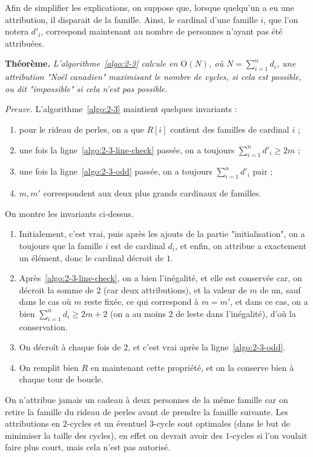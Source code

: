 \documentclass{../../notes}
\begin{document}
  Afin de simplifier les explications, on suppose que, lorsque quelqu'un a eu une attribution, il disparait de la famille.
  Ainsi, le cardinal d'une famille $i$, que l'on notera $d'_i$, correspond maintenant au nombre de personnes n'ayant pas été attribuées.

  \textbf{Théorème.} \textsl{L'algorithme~\ref{algo:2-3} calcule en $\mathrm{O}(N)$, où $N = \sum_{i=1}^n d_i$, une attribution "Noël canadien" maximisant le nombre de cycles, si cela est possible, ou dit "impossible" si cela n'est pas possible.}

  \textit{Preuve.} L'algorithme~\ref{algo:2-3} maintient quelques invariants :
  \begin{enumerate}
    \item pour le rideau de perles, on a que $R[i]$ contient des familles de cardinal $i$ ;
    \item une fois la ligne~\ref{algo:2-3-line-check} passée, on a toujours $\sum_{i=1}^n d'_i \ge 2 m$ ;
    \item une fois la ligne~\ref{algo:2-3-odd} passée, on a toujours $\sum_{i=1}^n d'_i$ pair ;
    \item $m, m'$ correspondent aux deux plus grands cardinaux de familles.
  \end{enumerate}

  On montre les invariants ci-dessus.
  \begin{enumerate}
    \item Initialement, c'est vrai, puis après les ajouts de la partie "initialisation", on a toujours que la famille $i$ est de cardinal $d_i$, et enfin, on attribue a exactement un élément, donc le cardinal décroit de $1$.
    \item Après~\ref{algo:2-3-line-check}, on a bien l'inégalité, et elle est conservée car, on décroit la somme de $2$ (car deux attributions), et la valeur de $m$ de un, sauf dans le cas où $m$ reste fixée, ce qui correspond à $m = m'$, et dans ce cas, on a bien $\sum_{i=1}^n d_i \ge 2m + 2$ (on a au moins $2$ de leste dans l'inégalité), d'où la conservation.
    \item On décroît à chaque fois de $2$, et c'est vrai après la ligne~\ref{algo:2-3-odd}.
    \item On remplit bien $R$ en maintenant cette propriété, et on la conserve bien à chaque tour de boucle.
  \end{enumerate}

  On n'attribue jamais un cadeau à deux personnes de la même famille car on retire la famille du rideau de perles avant de prendre la famille suivante.
  Les attributions en $2$-cycles et un éventuel $3$-cycle sont optimales (dans le but de minimiser la taille des cycles), en effet on devrait avoir des $1$-cycles si l'on voulait faire plus court, mais cela n'est pas autorisé.
\end{document}
